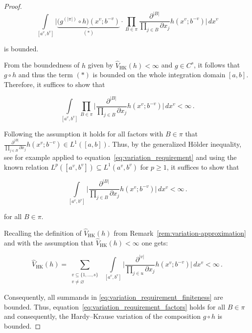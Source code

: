 \begin{proof}
\begin{equation*}
    \int\limits_{[a^{v},b^{v}]} \bigg| \underbrace{\big(g^{(|\pi|)}\circ h\big)(x^{v};b^{-v})}_{(*)} \cdot \prod_{B\in\pi} \frac{\partial^{|B|}}{\prod_{j\in B}\partial x_j}h(x^{v};b^{-v}) \bigg| \, dx^{v}
\end{equation*}

is bounded. 

From the boundedness of $h$ given by $\widehat{V}_\mathrm{HK}(h) <
\infty$ and $g\in C^s$, it follows that $g\circ h$ and thus the term $(*)$ is
bounded on the whole integration domain $[a,b]$. Therefore, it suffices to show that

\begin{equation}
    \int\limits_{[a^{v},b^{v}]} \prod_{B\in\pi} \bigg| \frac{\partial^{|B|}}{\prod_{j\in B}\partial x_j}h(x^{v};b^{-v}) \bigg| \, dx^{v} < \infty\,.
    \label{eq:variation_requirement}
\end{equation}

Following the assumption it holds for all factors with $B\in\pi$ that
$\frac{\partial^{|B|}}{\prod_{j\in B}\partial x_j}h(x^{v};b^{-v}) \in
L^1([a,b])$. Thus, by the generalized H{\"o}lder inequality, see for example
\cite[Corollary 2.11.5]{bogachev2007measure} applied to
equation~\eqref{eq:variation_requirement} and using the known relation
$L^p([a^v,b^v]) \subseteq L^1(a^v,b^v)$ for $p \geq 1$, it suffices to show that 

\begin{equation}
    \int\limits_{[a^{v},b^{v}]} \bigg| \frac{\partial^{|B|}}{\prod_{j\in B}\partial x_j}h(x^{v};b^{-v}) \bigg| \, dx^{v} < \infty\,.
    \label{eq:variation_requirement_factors}
\end{equation}

for all $B\in\pi$.

Recalling the definition of $\widehat{V}_\mathrm{HK}(h)$ from Remark~\ref{rem:variation-approximation} and with the assumption that $\widehat{V}_\mathrm{HK}(h) < \infty$ one gets:

\begin{equation}
    \widehat{V}_{\mathrm{HK}}(h) = 
    \sum\limits_{\substack{v\subseteq \{1,\dots,s\} \\ v \neq \varnothing}} 
    \,\, \int\limits_{[a^v,b^v]} \bigg|\frac{\partial^{|v|}}{\prod_{j\in u}\partial x_j}
    h(x^v;b^{-v}) \bigg| \,dx^v < \infty \,.
    \label{eq:variation_requirement_finiteness}
\end{equation}

Consequently, all summands in \eqref{eq:variation_requirement_finiteness} are
bounded. Thus, equation~\eqref{eq:variation_requirement_factors} holds for all $B\in\pi$ and consequently, the Hardy--Krause variation of the composition $g \circ h$ is bounded.
\end{proof}

